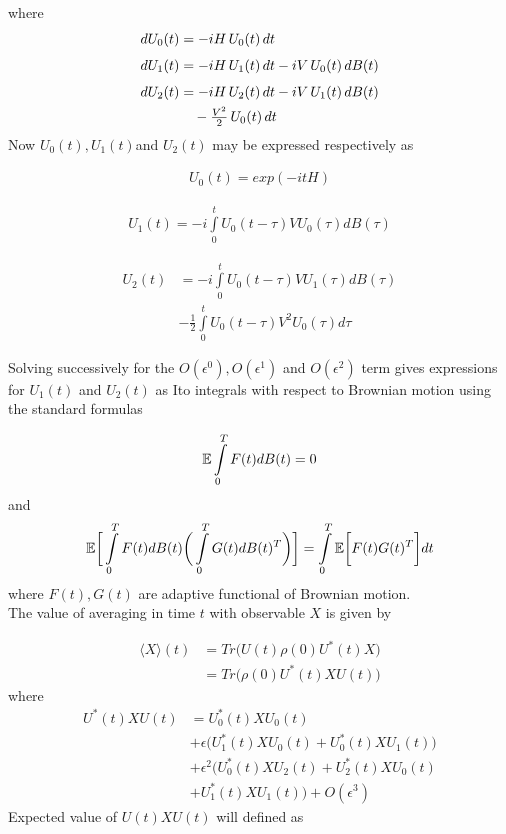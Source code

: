 \documentclass[journal,twocolumn]{IEEEtran}
\begin{document}
where
\begin{subequations}
\begin{align}
dU_0(t) &= -iH\,U_0(t)\,dt \\[4pt]
dU_1(t) &= -iH\,U_1(t)\,dt - iV\,U_0(t)\,dB(t) \\[4pt]
dU_2(t) &= -iH\,U_2(t)\,dt - iV\,U_1(t)\,dB(t) \notag\\
         &\quad - \tfrac{V^2}{2}\,U_0(t)\,dt
\end{align}
\end{subequations}
Now $U_0(t), U_1(t)$and $U_2(t)$ may be expressed respectively as

\begin{align}
U_0(t)= exp(-i t H)
\end{align}

\begin{align}
U_1(t)= -i\int\limits_0^t
U_0(t-\tau) V U_0(\tau)dB(\tau)
\end{align}

\begin{align}\nonumber
U_2(t)&= -i
\int\limits_0^t U_0(t-\tau) V U_1(\tau)dB(\tau)\\ &-
\frac{1}{2}\int\limits_0^t U_0(t-\tau) V^2 U_0 (\tau)d\tau
\end{align}

Solving successively for the $O(\epsilon^0), O(\epsilon^1)$ and $O(\epsilon^2)$ term gives expressions for $U_1(t)$ and $U_2(t)$ as Ito integrals with respect to Brownian motion using the standard formulas

\begin{align}
\Bbb{E}\int\limits_0^T F(t) dB(t)=0
\end{align}
and
\begin{align}
\Bbb{E}\bigg[\int\limits_0^T F(t) dB(t)\bigg(\int\limits_0^T G(t)
dB(t)^T\bigg)\bigg]= \int\limits_0^T
\Bbb{E}\bigg[F(t)G(t)^T\bigg]dt
\end{align}
where $F(t), G(t)$ are adaptive functional of Brownian motion.
\\The value of averaging in time $t$ with observable $X$ is given by

\begin{align}\nonumber
\langle X\rangle(t)&= Tr \big(U(t)\rho (0) U^{*}(t)X\big)\\
& =Tr\big(\rho(0)U^{*}(t)X U(t)\big)
\end{align}
where
\begin{align}\nonumber
U^{*}(t)X U(t)&= U_0^{*}(t)X U_0(t)\\&+\epsilon \bigg(U_1^{*}(t) X
U_0(t) + U_0^{*}(t)X U_1(t)\bigg)\\ \nonumber &+ \epsilon^2
\bigg(U_0^{*}(t) X U_2(t)+ U_2^{*}(t) X U_0(t) \\&+ U_1^{*} (t)X
U_1(t)\bigg)+ O(\epsilon^3)
\end{align}
Expected value of $U(t) X U(t)$ will defined as
\end{document}
